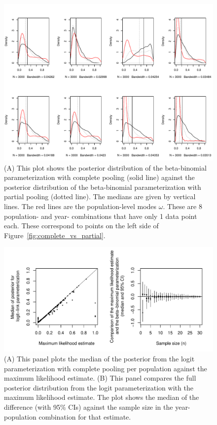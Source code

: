 \documentclass[12pt, oneside, titlepage]{article}   	%
\begin{document}
 \begin{figure}[h]
   \centering
       \includegraphics[page=1,width=.9\textwidth]{../../figures/appendix-x-mismatch}  
    \caption{ (A) This plot shows the posterior distribution of the beta-binomial parameterization with complete pooling (solid line) against the posterior distribution of the beta-binomial parameterization with partial pooling (dotted line). The medians are given by vertical lines. The red lines are the population-level modes $\omega$. These are 8 population- and year- combinations that have only 1 data point each. These correspond to points on the left side of Figure~\ref{fig:complete_vs_partial}. }
 \label{fig:mismatch}
\end{figure}

 \begin{figure}[h]
   \centering
       \includegraphics[page=1,width=.9\textwidth]{../../figures/appendix-x-mle_bayeslogit}  
    \caption{ (A) This panel plots the median of the posterior from the logit parameterization with complete pooling per population against the maximum likelihood estimate. (B) This panel compares the full posterior distribution from the logit parameterization with the maximum likelihood estimate. The plot shows the median of the difference (with 95\% CIs) against the sample size in the year-population combination for that estimate. }
 \label{fig:logit}
\end{figure}
\end{document}
